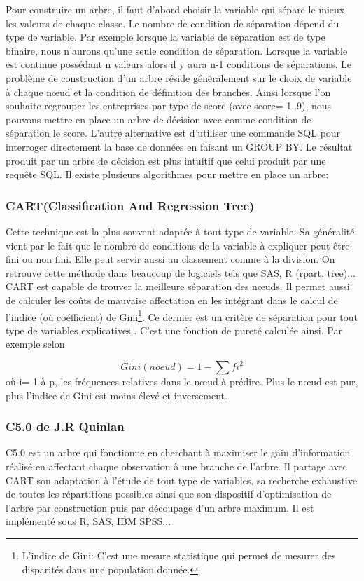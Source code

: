 \documentclass[11pt,a4paper]{report}
\begin{document}
Pour construire un arbre, il faut d'abord choisir la variable qui sépare le mieux les valeurs de chaque classe. Le nombre de condition de séparation dépend du type de variable. Par exemple lorsque la variable de séparation est de type binaire, nous n’aurons qu'une seule condition de séparation. Lorsque la variable est continue possédant n valeurs alors il y aura n-1 conditions de séparations. Le problème de construction d'un arbre réside généralement sur le choix de variable à chaque nœud et la condition de définition des branches. Ainsi lorsque l'on souhaite regrouper les entreprises par type de score (avec score= 1..9),  nous pouvons mettre en place un arbre de décision avec comme condition de séparation le score. L'autre alternative est d'utiliser une commande SQL pour interroger directement la base de données en faisant un GROUP BY. Le résultat produit par un arbre de décision est plus intuitif que celui produit par une requête SQL.
 Il existe plusieurs algorithmes pour mettre en place un arbre:

\subsubsection{CART(Classification And Regression Tree)}
Cette technique est la plus souvent adaptée à tout type de variable.
Sa généralité vient par le fait que le nombre de conditions de la variable à expliquer peut être fini ou non fini. Elle peut servir aussi au classement comme à la division. On retrouve cette méthode dans beaucoup de logiciels tels que SAS, R (rpart, tree)...
CART est capable de trouver la meilleure séparation des nœuds. Il permet aussi de calculer les coûts de mauvaise affectation en les intégrant dans le calcul de l'indice (où coéfficient) de Gini\footnote{L'indice de Gini: C'est une mesure statistique qui permet de mesurer des disparités dans une population donnée.}. Ce dernier est un critère de séparation pour tout type de variables explicatives \cite{gini}. C'est une fonction de pureté calculée ainsi. Par exemple selon 

\begin{equation}
  Gini(noeud)=1-\sum fi^2 
\end{equation}
où i= 1 à p, les fréquences relatives dans le nœud à prédire. Plus le nœud est pur, plus l'indice de Gini est moins élevé et inversement. 

\subsubsection{C5.0 de J.R Quinlan}
C5.0 est un arbre qui fonctionne en cherchant à maximiser le gain d'information réalisé en affectant chaque observation à une branche de l'arbre. Il partage avec CART son adaptation à l'étude de tout type de variables, sa recherche exhaustive de toutes les répartitions possibles ainsi que son dispositif d'optimisation de l'arbre par construction puis par découpage d'un arbre maximum. Il est implémenté sous R, SAS, IBM SPSS... 
 
\end{document}

